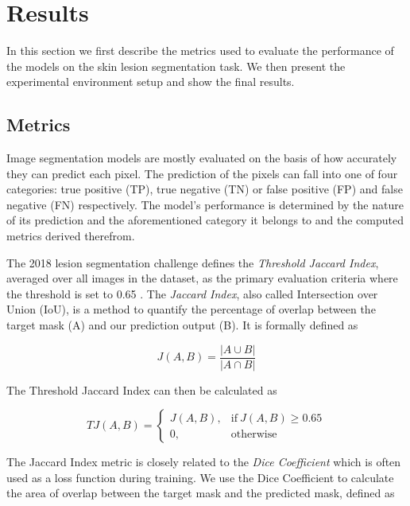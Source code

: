 \section{Results}

In this section we first describe the metrics used to evaluate the performance of the models on the skin lesion segmentation task. We then present the experimental environment setup and show the final results.

\subsection{Metrics}

Image segmentation models are mostly evaluated on the basis of how accurately they can predict each pixel. The prediction of the pixels can fall into one of four categories: true positive (TP), true negative (TN) or false positive (FP) and false negative (FN) respectively. The model’s performance is determined by the nature of its prediction and the aforementioned category it belongs to and the computed metrics derived therefrom.

The 2018 lesion segmentation challenge defines the \emph{Threshold Jaccard Index}, averaged over all images in the dataset, as the primary evaluation criteria where the threshold is set to 0.65 \citep{challenge-2018-codella}. The \emph{Jaccard Index}, also called Intersection over Union (IoU), is a method to quantify the percentage of overlap between the target mask (A) and our prediction output (B). It is formally defined as

\begin{equation}
  J(A, B) = \frac{|A \cup B|}{|A \cap B|}
\end{equation}

The Threshold Jaccard Index can then be calculated as

\begin{equation}
  TJ(A, B) = \begin{cases}
      J(A, B), & \text{if}\ J(A, B) \geq{0.65} \\
      0, & \text{otherwise}
    \end{cases}
\end{equation}

The Jaccard Index metric is closely related to the \emph{Dice Coefficient} which is often used as a loss function during training. We use the Dice Coefficient to calculate the area of overlap between the target mask and the predicted mask, defined as

